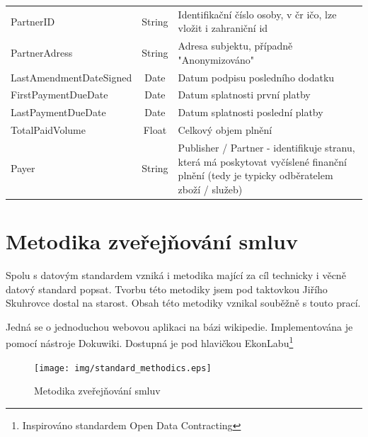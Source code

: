 \begin{center}
\begin{longtable}{lcp{65mm}}
\rowcolor{validateC}PartnerID & String & Identifikační číslo osoby, v čr ičo, lze vložit i zahraniční id \\
PartnerAdress & String & Adresa subjektu, případně "Anonymizováno" \\
LastAmendmentDateSigned & Date & Datum podpisu posledního dodatku \\
FirstPaymentDueDate & Date & Datum splatnosti první platby \\
LastPaymentDueDate & Date & Datum splatnosti poslední platby \\
TotalPaidVolume & Float & Celkový objem plnění \\
\rowcolor{validateC}Payer & String & Publisher / Partner - identifikuje stranu, která má poskytovat vyčíslené finanční plnění (tedy je typicky odběratelem zboží / služeb) \\
\end{longtable}
\end{center}

\newpage

\section{Metodika zveřejňování smluv}

Spolu s datovým standardem vzniká i metodika mající za cíl technicky i věcně datový standard popsat. Tvorbu této metodiky jsem pod taktovkou Jiřího Skuhrovce dostal na starost. Obsah této metodiky vznikal souběžně s touto prací.

Jedná se o jednoduchou webovou aplikaci na bázi wikipedie. Implementována je pomocí nástroje Dokuwiki\cite{dokuwiki}. Dostupná je pod hlavičkou EkonLabu\cite{metodika}\footnote{Inspirováno standardem Open Data Contracting\cite{ocds}}\\

\begin{figure}[h]
\centerline{\texttt{[image: img/standard\_methodics.eps]}}
\caption[Metodika zveřejňování smluv]{Metodika zveřejňování smluv\cite{metodika}}
\label{obr:standard_methodics}
\end{figure}

